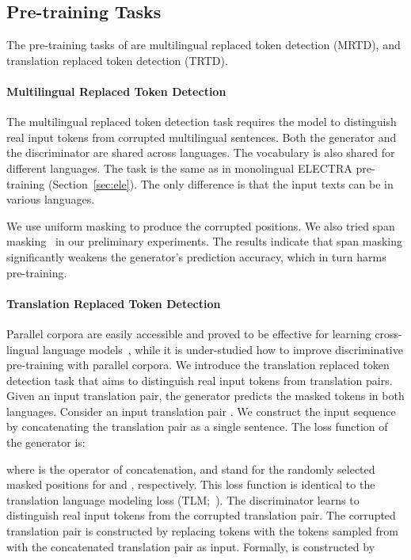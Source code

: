 \documentclass[11pt]{article}
\newcommand\our{\makebox{\textsc{XLM-E}}}
\begin{document}
\subsection{Pre-training Tasks}

The pre-training tasks of \our{} are multilingual replaced token detection (MRTD), and translation replaced token detection (TRTD).

\paragraph{Multilingual Replaced Token Detection}

The multilingual replaced token detection task requires the model to distinguish real input tokens from corrupted multilingual sentences.
Both the generator and the discriminator are shared across languages.
The vocabulary is also shared for different languages.
The task is the same as in monolingual ELECTRA pre-training (Section~\ref{sec:ele}). The only difference is that the input texts can be in various languages.

We use uniform masking to produce the corrupted positions.
We also tried span masking~\cite{spanbert,unilmv2} in our preliminary experiments. The results indicate that span masking significantly weakens the generator's prediction accuracy, which in turn harms pre-training.


\paragraph{Translation Replaced Token Detection}

Parallel corpora are easily accessible and proved to be effective for learning cross-lingual language models~\cite{xlm,infoxlm}, while it is under-studied how to improve discriminative pre-training with parallel corpora. We introduce the translation replaced token detection task that aims to distinguish real input tokens from translation pairs. Given an input translation pair, the generator predicts the masked tokens in both languages. Consider an input translation pair . We construct the input sequence by concatenating the translation pair as a single sentence.
The loss function of the generator  is:

where  is the operator of concatenation, and  stand for the randomly selected masked positions for  and , respectively. This loss function is identical to the translation language modeling loss (TLM;~\citealt{xlm}).
The discriminator  learns to distinguish real input tokens from the corrupted translation pair. The corrupted translation pair  is constructed by replacing tokens with the tokens sampled from  with the concatenated translation pair as input. Formally,  is constructed by
\end{document}
